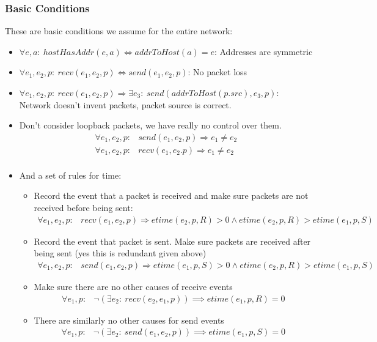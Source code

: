 \subsubsection{Basic Conditions}
These are basic conditions we assume for the entire network:
\begin{itemize}
\item $\forall e, a:\ hostHasAddr(e, a)\iff addrToHost(a) = e$: Addresses are symmetric
\item $\forall e_1, e_2, p:\ recv(e_1, e_2, p) \iff send(e_1, e_2, p)$: No packet loss
\item $\forall e_1, e_2, p:\ recv(e_1, e_2, p) \Rightarrow \exists e_3:\ send(addrToHost(p.src), e_3, p)$: Network doesn't
invent packets, packet source is correct.
\item Don't consider loopback packets, we have really no control over them.
\begin{align*}
\forall e_1, e_2, p:& send(e_1, e_2, p) \Rightarrow e_1 \neq e_2\\
\forall e_1, e_2, p:& recv(e_1, e_2. p) \Rightarrow e_1 \neq e_2\\
\end{align*}
\item And a set of rules for time:
\begin{itemize}
\item Record the event that a packet is received and make sure packets are not received before being sent:
\begin{align*}
    \forall e_1, e_2, p:& recv(e_1, e_2, p)\Rightarrow etime(e_2, p, R) > 0 \land etime(e_2, p, R) > etime(e_1, p, S)
\end{align*}
\item Record the event that packet is sent. Make sure packets are received after being sent (yes this is redundant given above)
\begin{align*}
    \forall e_1, e_2, p:& send(e_1, e_2, p)\Rightarrow etime(e_1, p, S) > 0 \land etime(e_2, p, R) > etime(e_1, p, S)
\end{align*}
\item Make sure there are no other causes of receive events
\begin{align*}
    \forall e_1, p:& \neg(\exists e_2:\ recv(e_2, e_1, p)) \implies etime(e_1, p, R) = 0
\end{align*}
\item There are similarly no other causes for send events
\begin{align*}
    \forall e_1, p:& \neg(\exists e_2:\ send(e_1, e_2, p)) \implies etime(e_1, p, S) = 0
\end{align*}
\end{itemize}
\end{itemize}

